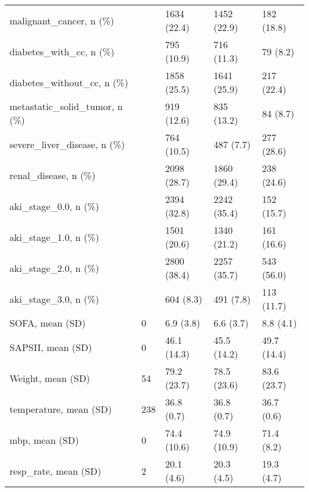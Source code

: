 \begin{tabular}{lllll}
malignant\_cancer, n (\%)                           &         &    1634 (22.4) &       1452 (22.9) &             182 (18.8) \\
diabetes\_with\_cc, n (\%)                           &         &     795 (10.9) &        716 (11.3) &               79 (8.2) \\
diabetes\_without\_cc, n (\%)                        &         &    1858 (25.5) &       1641 (25.9) &             217 (22.4) \\
metastatic\_solid\_tumor, n (\%)                     &         &     919 (12.6) &        835 (13.2) &               84 (8.7) \\
severe\_liver\_disease, n (\%)                       &         &     764 (10.5) &         487 (7.7) &             277 (28.6) \\
renal\_disease, n (\%)                              &         &    2098 (28.7) &       1860 (29.4) &             238 (24.6) \\
aki\_stage\_0.0, n (\%)                              &         &    2394 (32.8) &       2242 (35.4) &             152 (15.7) \\
aki\_stage\_1.0, n (\%)                              &         &    1501 (20.6) &       1340 (21.2) &             161 (16.6) \\
aki\_stage\_2.0, n (\%)                              &         &    2800 (38.4) &       2257 (35.7) &             543 (56.0) \\
aki\_stage\_3.0, n (\%)                              &         &      604 (8.3) &         491 (7.8) &             113 (11.7) \\
SOFA, mean (SD)                                   &       0 &      6.9 (3.8) &         6.6 (3.7) &              8.8 (4.1) \\
SAPSII, mean (SD)                                 &       0 &    46.1 (14.3) &       45.5 (14.2) &            49.7 (14.4) \\
Weight, mean (SD)                                 &      54 &    79.2 (23.7) &       78.5 (23.6) &            83.6 (23.7) \\
temperature, mean (SD)                            &     238 &     36.8 (0.7) &        36.8 (0.7) &             36.7 (0.6) \\
mbp, mean (SD)                                    &       0 &    74.4 (10.6) &       74.9 (10.9) &             71.4 (8.2) \\
resp\_rate, mean (SD)                              &       2 &     20.1 (4.6) &        20.3 (4.5) &             19.3 (4.7) \\

\end{tabular}
